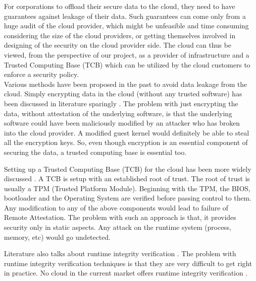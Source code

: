 \documentclass[10pt,twocolumn,pdftex]{article}
\begin{document}
For corporations to offload their secure data to the cloud, they need to have guarantees against leakage of their data. Such guarantees can come only from a huge audit of the cloud provider, which might be unfeasible and time consuming considering the size of the cloud providers, or getting themselves involved in designing of the security on the cloud provider side. The cloud can thus be viewed, from the perspective of our project, as a provider of infrastructure and a Trusted Computing Base (TCB) which can be utilized by the cloud customers to enforce a security policy. \\

Various methods have been proposed in the past to avoid data leakage from the cloud. Simply encrypting data in the cloud (without any trusted software) has been discussed in literature sparingly \cite{cryptographic-cloud-storage, towards-secure-cloud-storage}. The problem with just encrypting the data, without attestation of the underlying software, is that the underlying software could have been maliciously modified by an attacker who has broken into the cloud provider. A modified guest kernel would definitely be able to steal all the encryption keys. So, even though encryption is an essential component of securing the data, a trusted computing base is essential too.

Setting up a Trusted Computing Base (TCB) for the cloud has been more widely discussed \cite{towards-trusted-cloud-computing, seeding-clouds-with-trust-anchors, terra, semantic-remote}. A TCB is setup with an established root of trust. The root of trust is usually a TPM (Trusted Platform Module). Beginning with the TPM, the BIOS, bootloader and the Operating System are verified before passing control to them. Any modification to any of the above components would lead to failure of Remote Attestation. The problem with such an approach is that, it provides security only in static aspects. Any attack on the runtime system (process, memory, etc) would go undetected. 

Literature also talks about runtime integrity verification \cite{integrity-1, integrity-2, integrity-3, integrity-4}. The problem with runtime integrity verification techniques is that they are very difficult to get right in practice. No cloud in the current market offers runtime integrity verification \cite{seeding-clouds-with-trust-anchors}.
\end{document}
